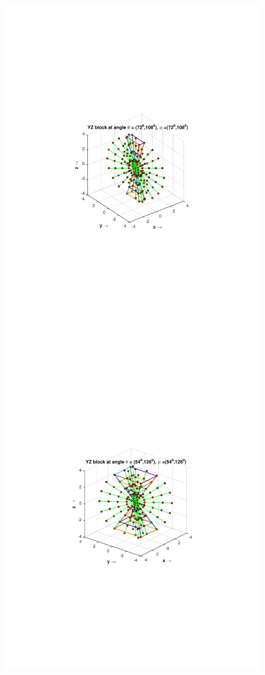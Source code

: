 \documentclass{UCF_ETD}
\begin{document}
\begin{figure}[H]
\begin{center}
 \includegraphics[scale=0.53]{PolarSphericalDFT/YZBlockLevel1}
 \includegraphics[scale=0.54]{PolarSphericalDFT/YZBlockLevel22}

\end{center}
\end{figure}
\end{document}
